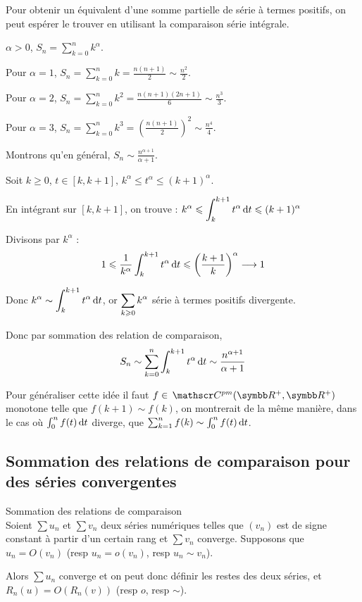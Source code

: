 \begin{exemple}
    Pour obtenir un équivalent d'une somme partielle de série à termes positifs, 
    on peut espérer le trouver en utilisant la comparaison série intégrale.

    $\alpha > 0$, $\displaystyle S_n = \sum_{k = 0 }^{n } k^\alpha$. 

    Pour $\alpha = 1$, $\displaystyle S_n = \sum_{k = 0 }^{n } k = \frac{n(n + 1)}{2} \sim \frac{n^2}{2}$.

    Pour $\alpha = 2$, $\displaystyle S_n = \sum_{k = 0 }^{n } k^2 = \frac{n(n + 1)(2n + 1)}{6} \sim \frac{n^3}{3}$.

    Pour $\alpha = 3$, $\displaystyle S_n = \sum_{k = 0 }^{n } k^3 = \left( \frac{n(n + 1)}{2} \right)^2 \sim \frac{n^4}{4}$.

    Montrons qu'en général, $\displaystyle S_n \sim \frac{n^{\alpha + 1}}{\alpha + 1}$.

    Soit $k \geqslant 0$, $t \in [k, k + 1], \, k^\alpha \leqslant t^\alpha \leqslant (k + 1)^\alpha$.

    En intégrant sur $[k, k + 1]$, on trouve : $\displaystyle k^\alpha \leqslant \int_{k}^{k + 1} t^\alpha \,\mathrm{d}t \leqslant (k + 1)^\alpha$

    Divisons par $k^\alpha$ : 
    \[1 \leqslant \frac 1 {k^\alpha} \int_{k}^{k + 1} t^\alpha \,\mathrm{d}t \leqslant \left( \frac{k+1} k \right)^\alpha \longrightarrow 1\]

    Donc $\displaystyle k^\alpha \sim \int_{k }^{k + 1} t^\alpha \,\mathrm{d}t$, or $\displaystyle \sum_{k \geqslant 0 } k^\alpha$ série à termes positifs divergente. 

    Donc par sommation des relation de comparaison, 
    \[S_n \sim \sum_{k = 0}^{n } \int_{k}^{k + 1} t^\alpha \,\mathrm{d}t \sim \frac{n^{\alpha + 1}}{\alpha + 1}\]
\end{exemple}

\begin{remarque}
Pour généraliser cette idée il faut $f\in  \mc{pm}(\R^+, \R^+)$ monotone telle que $f(k+1) \sim f(k)$, on
montrerait de la même manière, dans le cas où $\int_0^n f(t) \,\mathrm{d}t$ diverge, que $\sum_{k=1}^n f(k) \sim \int_0^n f(t) \,\mathrm{d}t$.
\end{remarque}

\subsection{Sommation des relations de comparaison pour des séries convergentes}

\begin{theoreme}{Sommation des relations de comparaison}{}\\
    Soient $\sum u_n$ et $\sum v_n$ deux séries numériques telles que 
    $(v_n)$ est de signe constant à partir d'un certain rang et $\sum v_n$ converge.
    Supposons que $u_n = O(v_n)$ (resp $u_n = o(v_n)$, resp $u_n \sim v_n$).

    \svspace Alors $\sum u_n$ converge et on peut donc définir les restes des deux séries, et 
    $\displaystyle R_n(u) = O(R_n(v))$ (resp $o$, resp $\sim$).
\end{theoreme}

